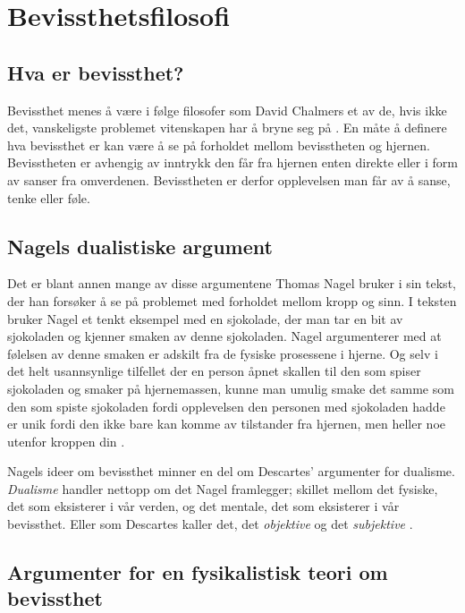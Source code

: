 \section{Bevissthetsfilosofi}

\subsection{Hva er bevissthet?}

Bevissthet menes å være i følge filosofer som David Chalmers et av de, hvis ikke det, 
vanskeligste problemet vitenskapen har å bryne seg på \autocite{Chalmers1995}. 
En måte å definere hva bevissthet er kan være å se på forholdet mellom bevisstheten og hjernen.
Bevisstheten er avhengig av inntrykk den får fra hjernen enten direkte eller i form av sanser fra omverdenen. 
Bevisstheten er derfor opplevelsen man får av å sanse, tenke eller føle. 

\subsection{Nagels dualistiske argument}

Det er blant annen mange av disse argumentene Thomas Nagel bruker i sin tekst, 
der han forsøker å se på problemet med forholdet mellom kropp og sinn.
I teksten bruker Nagel et tenkt eksempel med en sjokolade,
der man tar en bit av sjokoladen og kjenner smaken av denne sjokoladen. 
Nagel argumenterer med at følelsen av denne smaken er adskilt fra de fysiske prosessene i hjerne. 
Og selv i det helt usannsynlige tilfellet der en person åpnet skallen til den som spiser sjokoladen og smaker på hjernemassen, 
kunne man umulig smake det samme som den som spiste sjokoladen fordi opplevelsen den personen med sjokoladen hadde er unik fordi den ikke bare kan komme av tilstander fra hjernen, 
men heller noe utenfor kroppen din \autocite[32-34]{Nagel2003}. 

Nagels ideer om bevissthet minner en del om Descartes' argumenter for dualisme.
\textit{Dualisme} handler nettopp om det Nagel framlegger; 
skillet mellom det fysiske, det som eksisterer i vår verden, og det mentale, det som eksisterer i vår bevissthet. 
Eller som Descartes kaller det, det \textit{objektive} og det \textit{subjektive} \autocite[156]{Dybvig2003}.


\subsection{Argumenter for en fysikalistisk teori om bevissthet}


